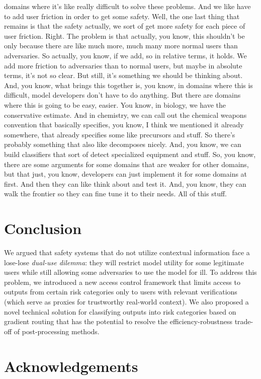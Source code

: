\documentclass{article}
\theoremstyle{plain}
\theoremstyle{definition}
\theoremstyle{remark}
\begin{document}
domains where it's like really difficult to solve these problems. And we like have to add user friction in order to get some safety. Well, the one last thing that remains is that the safety actually, we sort of get more safety for each piece of user friction. Right. The problem is that actually, you know, this shouldn't be only because there are like much more, much many more normal users than adversaries. So actually, you know, if we add, so in relative terms, it holds. We add more friction to adversaries than to normal users, but maybe in absolute terms, it's not so clear. But still, it's something we should be thinking about. And, you know, what brings this together is, you know, in domains where this is difficult, model developers don't have to do anything. But there are domains where this is going to be easy, easier. You know, in biology, we have the conservative estimate. And in chemistry, we can call out the chemical weapons convention that basically specifies, you know, I think we mentioned it already somewhere, that already specifies some like precursors and stuff. So there's probably something that also like decomposes nicely. And, you know, we can build classifiers that sort of detect specialized equipment and stuff. So, you know, there are some arguments for some domains that are weaker for other domains, but that just, you know, developers can just implement it for some domains at first. And then they can like think about and test it. And, you know, they can walk the frontier so they can fine tune it to their needs. All of this stuff.

\section{Conclusion}

We argued that safety systems that do not utilize contextual
information face a lose-lose \emph{dual-use dilemma}: they will
restrict model utility for some legitimate users while still allowing
some adversaries to use the model for ill. To address this problem,
we introduced a new access control framework that limits access to
outputs from certain risk categories only to users with relevant
verifications (which serve as proxies for trustworthy real-world
context). We also proposed a novel technical solution for classifying
outputs into risk categories based on gradient routing that has the
potential to resolve the efficiency-robustness trade-off of
post-processing methods.

\section*{Acknowledgements}
\end{document}
